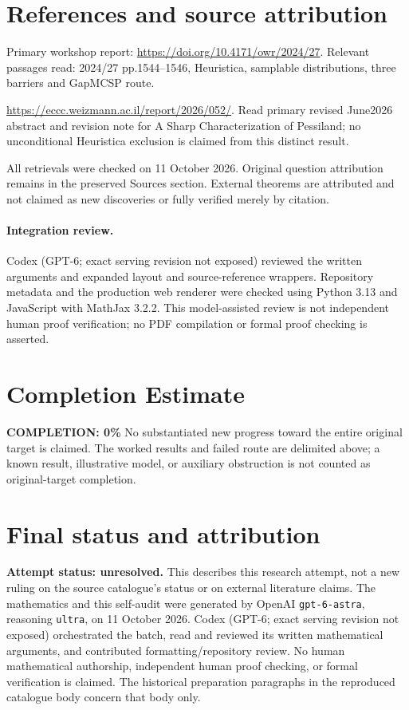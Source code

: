 \documentclass[11pt]{article}
\begin{document}
\section{References and source attribution}
Primary workshop report: \url{https://doi.org/10.4171/owr/2024/27}. Relevant passages read: 2024/27 pp.1544--1546, Heuristica, samplable distributions, three barriers and GapMCSP route.

\url{https://eccc.weizmann.ac.il/report/2026/052/}. Read primary revised June2026 abstract and revision note for A Sharp Characterization of Pessiland; no unconditional Heuristica exclusion is claimed from this distinct result.

All retrievals were checked on 11 October 2026. Original question attribution remains in the preserved Sources section. External theorems are attributed and not claimed as new discoveries or fully verified merely by citation.


\paragraph{Integration review.} Codex (GPT-6; exact serving revision not exposed) reviewed the written arguments and expanded layout and source-reference wrappers. Repository metadata and the production web renderer were checked using Python 3.13 and JavaScript with MathJax 3.2.2. This model-assisted review is not independent human proof verification; no PDF compilation or formal proof checking is asserted.

\section{Completion Estimate}
\noindent\textbf{COMPLETION: 0\%}
No substantiated new progress toward the entire original target is claimed. The worked results and failed route are delimited above; a known result, illustrative model, or auxiliary obstruction is not counted as original-target completion.

\section{Final status and attribution}
\textbf{Attempt status: unresolved.} This describes this research attempt, not a new ruling on the source catalogue's status or on external literature claims.
The mathematics and this self-audit were generated by OpenAI \texttt{gpt-6-astra}, reasoning \texttt{ultra}, on 11 October 2026. Codex (GPT-6; exact serving revision not exposed) orchestrated the batch, read and reviewed its written mathematical arguments, and contributed formatting/repository review. No human mathematical authorship, independent human proof checking, or formal verification is claimed. The historical preparation paragraphs in the reproduced catalogue body concern that body only.
\end{document}
